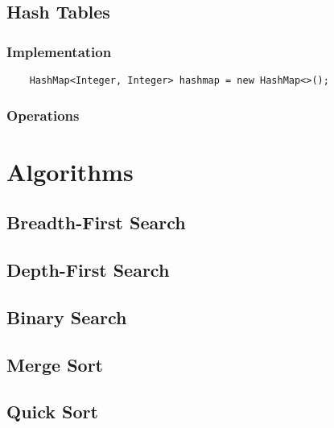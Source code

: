 \documentclass[]{article}
\newcommand{\impl}{\subsubsection{Implementation}}
\newcommand{\ops}{\subsubsection{Operations}}
\begin{document}
\subsection{Hash Tables}
\impl
\begin{verbatim}
	HashMap<Integer, Integer> hashmap = new HashMap<>();
\end{verbatim}
\ops

\section{Algorithms}
\subsection{Breadth-First Search}

\subsection{Depth-First Search}

\subsection{Binary Search}

\subsection{Merge Sort}

\subsection{Quick Sort}
\end{document}
